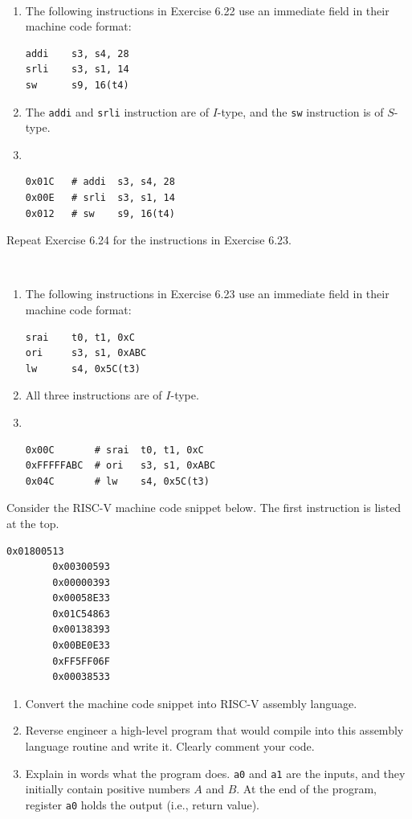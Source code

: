 \documentclass[12pt]{article}
\newenvironment{ex}[2][Exercise]{\begin{trivlist}
		\item[\hskip \labelsep {\bfseries #1}\hskip \labelsep {\bfseries #2.}]}{\end{trivlist}}
\newenvironment{sol}[1][Solution]{\begin{trivlist}
		\item[\hskip \labelsep {\bfseries #1:}]}{\end{trivlist}}
\begin{document}
\begin{sol}
	\
	\begin{enumerate}[label=(\alph*)]
		\item The following instructions in Exercise 6.22 use an immediate field
		in their machine code format:
		\begin{lstlisting}[language={}]
addi	s3,	s4,	28
srli	s3,	s1,	14
sw		s9,	16(t4)
		\end{lstlisting}
		\item The \texttt{addi} and \texttt{srli} instruction are of $I$-type,
		and the \texttt{sw} instruction is of $S$-type.
		\item
		\
		\begin{lstlisting}[language={}]
0x01C	# addi	s3,	s4,	28
0x00E	# srli	s3,	s1,	14
0x012	# sw	s9,	16(t4)
		\end{lstlisting}
	\end{enumerate}
\end{sol}

\begin{ex}{6.25}
	Repeat Exercise 6.24 for  the instructions in Exercise 6.23.
\end{ex}

\begin{sol}
	\
	\begin{enumerate}[label=(\alph*)]
		\item The following instructions in Exercise 6.23 use an immediate field
		in their machine code format:
		\begin{lstlisting}[language={}]
srai	t0,	t1,	0xC
ori		s3,	s1,	0xABC
lw		s4,	0x5C(t3)
		\end{lstlisting}
		\item All three instructions are of $I$-type.
		\item
		\
		\begin{lstlisting}[language={}]
0x00C		# srai	t0, t1, 0xC
0xFFFFFABC	# ori	s3,	s1,	0xABC
0x04C		# lw	s4,	0x5C(t3)
		\end{lstlisting}
	\end{enumerate}
\end{sol}

\begin{ex}{6.26}
	Consider the RISC-V machine code snippet below. The first instruction is listed at
	the top.
	\begin{lstlisting}[language={}]
		0x01800513
		0x00300593
		0x00000393
		0x00058E33
		0x01C54863
		0x00138393
		0x00BE0E33
		0xFF5FF06F
		0x00038533
	\end{lstlisting}
	\begin{enumerate}[label=(\alph*)]
		\item Convert the machine code snippet into RISC-V assembly language.
		\item Reverse engineer a high-level program that would compile into this assembly
		language routine and write it. Clearly comment your code.
		\item Explain in words what the program does. \texttt{a0} and \texttt{a1} are the
		inputs, and they initially contain positive numbers $A$ and $B$. At the end of the
		program, register \texttt{a0} holds the output (i.e., return value).
	\end{enumerate}
\end{ex}
\end{document}

